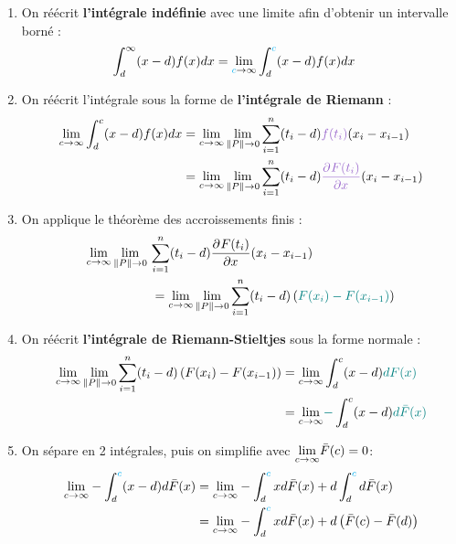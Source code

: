 \documentclass[10pt, french]{article}
\begin{document}
\begin{multicols*}{2}
\begin{enumerate}[resume]
	\item	On réécrit \textbf{l'intégrale indéfinie} avec une limite afin d'obtenir un intervalle borné :
		\begin{align}
		\int_{d}^{\infty} (x - d) f(x) dx
			&=	\underset{{\color{cyan}c} \rightarrow \infty}{\lim} \int_{d}^{{\color{cyan}c}} (x - d) f(x) dx	
		\end{align}
	\item	On réécrit l'intégrale sous la forme de \textbf{l'intégrale de Riemann} :
		\begin{align}
		\limz{c}{\infty} \int_{d}^{c} (x - d) f(x) dx	
			&=	\limz{c}{\infty} \lim_{\lVert P \rVert \rightarrow 0} \sumz{n}{i = 1} (t_{i} - d) {\color{amethyst}f(t_{i})}(x_{i} - x_{i - 1})	\nonumber\\
			&=	\limz{c}{\infty} \lim_{\lVert P \rVert \rightarrow 0} \sumz{n}{i = 1} (t_{i} - d) {\color{amethyst}\deriv{x}{F(t_{i})}}(x_{i} - x_{i - 1})	
		\end{align}
	\item	On applique le théorème des accroissements finis : 
		\begin{align}
		\limz{c}{\infty} \lim_{\lVert P \rVert \rightarrow 0}\ &\sumz{n}{i = 1} (t_{i} - d) \deriv{x}{F(t_{i})}(x_{i} - x_{i - 1})	\nonumber\\
			&=	\limz{c}{\infty} \lim_{\lVert P \rVert \rightarrow 0} \sumz{n}{i = 1} (t_{i} - d) \left({\color{teal}F(x_{i}) - F(x_{i - 1})}\right)	
		\end{align}
	\item	On réécrit \textbf{l'intégrale de Riemann-Stieltjes} sous la forme normale :
		\begin{align*}
		\underset{c \rightarrow \infty}{\lim} \lim_{\lVert P \rVert \rightarrow 0} \overset{n}{\underset{i = 1}{\sum}} (t_{i} - d) \left(F(x_{i}) - F(x_{i - 1})\right)
			&=	\underset{c \rightarrow \infty}{\lim} \int_{d}^{c} (x - d) {\color{teal}dF(x)}	\\
			&=	\underset{c \rightarrow \infty}{\lim} {\color{teal}-}\int_{d}^{c} (x - d) {\color{teal}d\bar{F}(x)}
		\end{align*}	
	\item	On sépare en 2 intégrales, puis on simplifie avec $\underset{c \rightarrow \infty}{\lim} \bar{F}(c) = 0$:
		\begin{align*}
		\limz{c}{\infty} -\int_{d}^{{\color{cyan}c}} (x - d) d\bar{F}(x)	
		&=	\limz{c}{\infty} -\int_{d}^{{\color{cyan}c}} x d\bar{F}(x) + d\int_{d}^{{\color{cyan}c}} d\bar{F}(x)	\\
		&=	\limz{c}{\infty} -\int_{d}^{{\color{cyan}c}} x d\bar{F}(x) + d\left( \bar{F}(c) - \bar{F}(d)\right)	\\

\end{align*}
\end{enumerate}
\end{multicols*}
\end{document}
